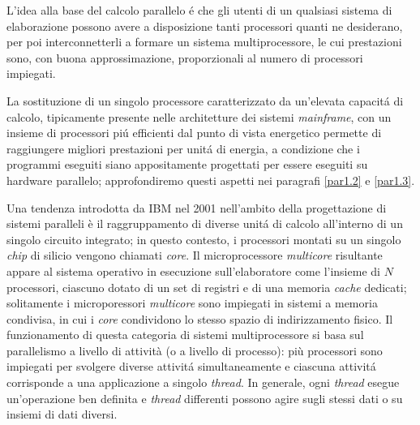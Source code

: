 L'idea alla base del calcolo parallelo \'e che gli utenti di un qualsiasi sistema di elaborazione possono avere a disposizione tanti processori
quanti ne desiderano, per poi interconnetterli a formare un sistema
multiprocessore, le cui prestazioni sono, con buona approssimazione,
proporzionali al numero di processori impiegati.

La sostituzione di un singolo processore caratterizzato da un'elevata
capacit\'a di calcolo, tipicamente presente nelle architetture dei sistemi
\textit{mainframe}, con un insieme di processori pi\'u efficienti
dal punto di vista energetico permette di raggiungere migliori prestazioni
per unit\'a di energia, a condizione che i programmi eseguiti siano
appositamente progettati per essere eseguiti su hardware parallelo; approfondiremo questi aspetti nei paragrafi \ref{par1.2} e \ref{par1.3}.

Una tendenza introdotta da IBM nel 2001 nell'ambito della progettazione di sistemi paralleli \cite{tendler2001power4} è il raggruppamento
di diverse unit\'a di calcolo all'interno di un singolo circuito integrato; in questo contesto, i processori montati su un singolo \textit{chip} di silicio vengono chiamati \textit{core}.
Il microprocessore \textit{multicore} risultante appare al sistema operativo in esecuzione sull'elaboratore come l'insieme di $N$ processori, ciascuno dotato di un set di registri e di una memoria \textit{cache} dedicati; solitamente i microporessori \textit{multicore} sono impiegati in sistemi a memoria condivisa, in cui i \textit{core} condividono lo stesso spazio di indirizzamento fisico.\newline
Il funzionamento di questa categoria di sistemi multiprocessore si basa sul parallelismo a livello di attività (o a livello di processo): più
processori sono impiegati per svolgere diverse attivit\'a simultaneamente e ciascuna attivit\'a corrisponde a una applicazione a singolo
\textit{thread}.\newline
In generale, ogni \textit{thread} esegue un'operazione ben definita e \textit{thread} differenti possono agire sugli stessi
dati o su insiemi di dati diversi.

